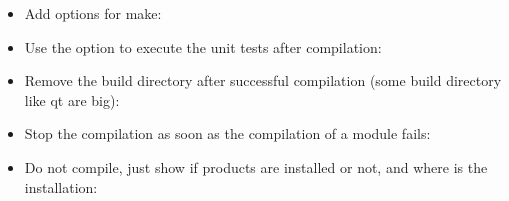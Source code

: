 \documentclass[a4paper,10pt,english]{sphinxmanual}
\begin{document}
\begin{itemize}
\item {} 
Add options for make:

%
\begin{sphinxVerbatim}[commandchars=\\\{\}]
      
\end{sphinxVerbatim}

\item {} 
Use the  option to execute the unit tests after compilation:

%
\begin{sphinxVerbatim}[commandchars=\\\{\}]
   
\end{sphinxVerbatim}

\item {} 
Remove the build directory after successful compilation (some build directory like qt are big):

%
\begin{sphinxVerbatim}[commandchars=\\\{\}]
     
\end{sphinxVerbatim}

\item {} 
Stop the compilation as soon as the compilation of a module fails:

%
\begin{sphinxVerbatim}[commandchars=\\\{\}]
   
\end{sphinxVerbatim}

\item {} 
Do not compile, just show if products are installed or not, and where is the installation:

%
\begin{sphinxVerbatim}[commandchars=\\\{\}]
   
\end{sphinxVerbatim}

\end{itemize}
\end{document}

